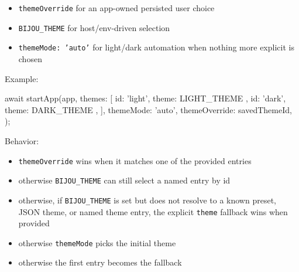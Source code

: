 \begin{itemize}
\tightlist
\item
  \texttt{t\allowbreak{}h\allowbreak{}e\allowbreak{}m\allowbreak{}e\allowbreak{}O\allowbreak{}v\allowbreak{}e\allowbreak{}r\allowbreak{}r\allowbreak{}i\allowbreak{}d\allowbreak{}e} for an app-owned persisted user choice
\item
  \texttt{B\allowbreak{}I\allowbreak{}J\allowbreak{}O\allowbreak{}U\allowbreak{}\_\allowbreak{}T\allowbreak{}H\allowbreak{}E\allowbreak{}M\allowbreak{}E} for host/env-driven selection
\item
  \texttt{t\allowbreak{}h\allowbreak{}e\allowbreak{}m\allowbreak{}e\allowbreak{}M\allowbreak{}o\allowbreak{}d\allowbreak{}e\allowbreak{}:\allowbreak{} \allowbreak{}'\allowbreak{}a\allowbreak{}u\allowbreak{}t\allowbreak{}o\allowbreak{}'} for light/dark automation when nothing more explicit is chosen
\end{itemize}

Example:

\begin{CodeBlock}
await startApp(app, {
  themes: [
    { id: 'light', theme: LIGHT_THEME },
    { id: 'dark', theme: DARK_THEME },
  ],
  themeMode: 'auto',
  themeOverride: savedThemeId,
});
\end{CodeBlock}

Behavior:

\begin{itemize}
\tightlist
\item
  \texttt{t\allowbreak{}h\allowbreak{}e\allowbreak{}m\allowbreak{}e\allowbreak{}O\allowbreak{}v\allowbreak{}e\allowbreak{}r\allowbreak{}r\allowbreak{}i\allowbreak{}d\allowbreak{}e} wins when it matches one of the provided entries
\item
  otherwise \texttt{B\allowbreak{}I\allowbreak{}J\allowbreak{}O\allowbreak{}U\allowbreak{}\_\allowbreak{}T\allowbreak{}H\allowbreak{}E\allowbreak{}M\allowbreak{}E} can still select a named entry by id
\item
  otherwise, if \texttt{B\allowbreak{}I\allowbreak{}J\allowbreak{}O\allowbreak{}U\allowbreak{}\_\allowbreak{}T\allowbreak{}H\allowbreak{}E\allowbreak{}M\allowbreak{}E} is set but does not resolve to a known preset, JSON theme, or named theme entry, the explicit \texttt{t\allowbreak{}h\allowbreak{}e\allowbreak{}m\allowbreak{}e} fallback wins when provided
\item
  otherwise \texttt{t\allowbreak{}h\allowbreak{}e\allowbreak{}m\allowbreak{}e\allowbreak{}M\allowbreak{}o\allowbreak{}d\allowbreak{}e} picks the initial theme
\item
  otherwise the first entry becomes the fallback
\end{itemize}

